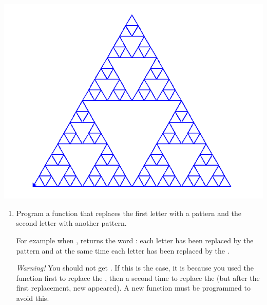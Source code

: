 \documentclass[11pt,class=report,crop=false]{standalone}
\begin{document}
\begin{activite}



\begin{center}	
\includegraphics[scale=\myscale,scale=0.35]{screen-lsystems-7e}
\end{center}

\begin{enumerate}
  \item Program a  function that replaces the first letter with a pattern and the second letter with another pattern. 

For example when ,  returns the word : each letter  has been replaced by the pattern  and at the same time each letter  has been replaced by the .

\emph{Warning!} You should not get . If this is the case, it is because you used the  function first to replace the , then a second time to replace the  (but after the first replacement, new  appeared). A new function must be programmed to avoid this. 


\end{enumerate}
\end{activite}
\end{document}
